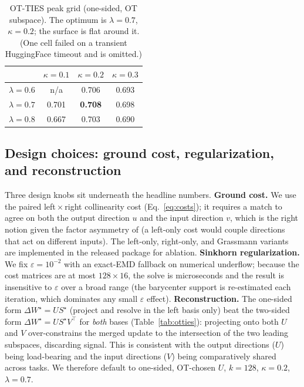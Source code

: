 \documentclass[11pt]{article}
\newcommand{\dW}{\Delta W}
\newcommand{\otties}{\textsc{OT-TIES}}
\begin{document}
\begin{table}[t]
\centering
\caption{\otties{} peak grid (one-sided, OT subspace). The optimum is $\lambda=0.7$, $\kappa=0.2$; the
surface is flat around it. (One cell failed on a transient HuggingFace timeout and is omitted.)}
\label{tab:peak}
\small
\begin{tabular}{lccc}
\toprule
& $\kappa=0.1$ & $\kappa=0.2$ & $\kappa=0.3$ \\
\midrule
$\lambda=0.6$ & n/a & 0.706 & 0.693 \\
$\lambda=0.7$ & 0.701 & \textbf{0.708} & 0.698 \\
$\lambda=0.8$ & 0.667 & 0.703 & 0.690 \\
\bottomrule
\end{tabular}
\end{table}

\subsection{Design choices: ground cost, regularization, and reconstruction}
\label{sec:results-design}
Three design knobs sit underneath the headline numbers. \textbf{Ground cost.} We use the paired
left\,$\times$\,right collinearity cost (Eq.~\eqref{eq:costs}); it requires a match to agree on both the
output direction $u$ and the input direction $v$, which is the right notion given the factor asymmetry of
\citet{zhu2024asymmetry} (a left-only cost would couple directions that act on different inputs). The
left-only, right-only, and Grassmann variants are implemented in the released package for ablation.
\textbf{Sinkhorn regularization.} We fix $\varepsilon=10^{-2}$ with an exact-EMD fallback on numerical
underflow; because the cost matrices are at most $128\times16$, the solve is microseconds and the result
is insensitive to $\varepsilon$ over a broad range (the barycenter support is re-estimated each iteration,
which dominates any small $\varepsilon$ effect). \textbf{Reconstruction.} The one-sided form
$\dW^\star=US^\star$ (project and resolve in the left basis only) beat the two-sided form
$\dW^\star=US^\star V^\top$ for \emph{both} bases (Table~\ref{tab:otties}): projecting onto both $U$ and
$V$ over-constrains the merged update to the intersection of the two leading subspaces, discarding signal.
This is consistent with the output directions ($U$) being load-bearing and the input directions ($V$)
being comparatively shared across tasks. We therefore default to one-sided, OT-chosen $U$, $k=128$,
$\kappa=0.2$, $\lambda=0.7$.
\end{document}
